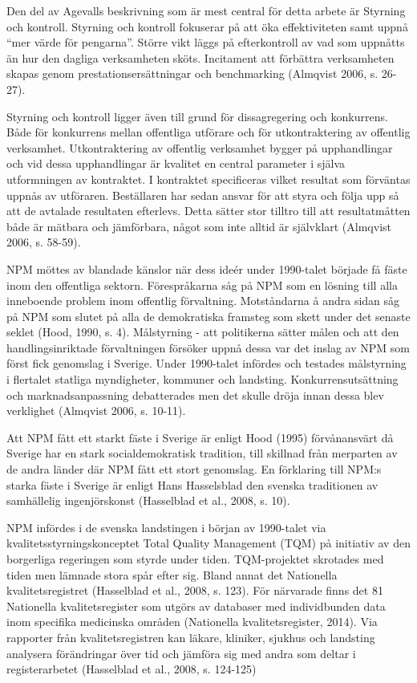 Den del av Agevalls beskrivning som är mest central för detta arbete är Styrning och kontroll. Styrning och kontroll fokuserar på att öka effektiviteten samt uppnå “mer värde för pengarna”. Större vikt läggs på efterkontroll av vad som uppnåtts än hur den dagliga verksamheten sköts. Incitament att förbättra verksamheten skapas genom prestationsersättningar och benchmarking (Almqvist 2006, s. 26-27).
 
Styrning och kontroll ligger även till grund för dissagregering och konkurrens. Både för konkurrens mellan offentliga utförare och för utkontraktering av offentlig verksamhet. Utkontraktering av offentlig verksamhet bygger på upphandlingar och vid dessa upphandlingar är kvalitet en central parameter i själva utformningen av kontraktet. I kontraktet specificeras vilket resultat som förväntas uppnås av utföraren. Beställaren har sedan ansvar för att styra och följa upp så att de avtalade resultaten efterlevs. Detta sätter stor tilltro till att resultatmåtten både är mätbara och jämförbara, något som inte alltid är självklart (Almqvist 2006, s. 58-59).
 
NPM möttes av blandade känslor när dess ideér under 1990-talet började få fäste inom den offentliga sektorn. Förespråkarna såg på NPM som en lösning till alla inneboende problem inom offentlig förvaltning. Motståndarna å andra sidan såg på NPM som slutet på alla de demokratiska framsteg som skett under det senaste seklet (Hood, 1990, s. 4). Målstyrning - att politikerna sätter målen och att den handlingsinriktade förvaltningen försöker uppnå dessa var det inslag av NPM som först fick genomslag i Sverige. Under 1990-talet infördes och testades målstyrning i flertalet statliga myndigheter, kommuner och landsting. Konkurrensutsättning och marknadsanpassning debatterades men det skulle dröja innan dessa blev verklighet (Almqvist 2006, s. 10-11).
 
Att NPM fått ett starkt fäste i Sverige är enligt Hood (1995) förvånansvärt då
Sverige har en stark socialdemokratisk tradition, till skillnad från merparten av de andra länder där NPM fått ett stort genomslag. En förklaring till NPM:s starka fäste i Sverige är enligt Hans Hasselsblad den svenska traditionen av samhällelig ingenjörskonst (Hasselblad et al., 2008, s. 10).
 
NPM infördes i de svenska landstingen i början av 1990-talet via kvalitetsstyrningskonceptet Total Quality Management (TQM) på initiativ av den borgerliga regeringen som styrde under tiden. TQM-projektet skrotades med tiden men lämnade stora spår efter sig. Bland annat det Nationella kvalitetsregistret (Hasselblad et al., 2008, s. 123). För närvarade finns det 81 Nationella kvalitetsregister som utgörs av databaser med individbunden data inom specifika medicinska områden (Nationella kvalitetsregister, 2014). Via rapporter från kvalitetsregistren kan läkare, kliniker, sjukhus och landsting analysera förändringar över tid och jämföra sig med andra som deltar i registerarbetet (Hasselblad et al., 2008, s. 124-125)

